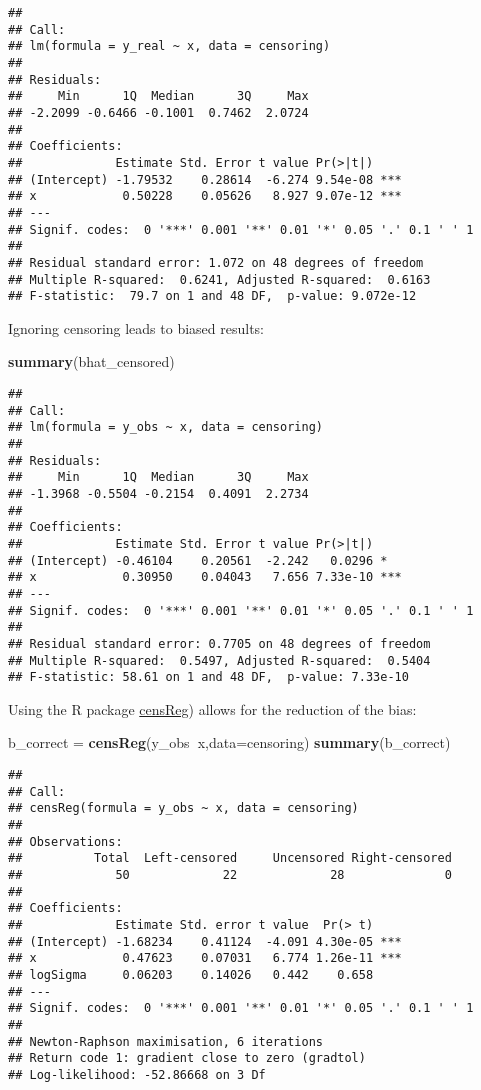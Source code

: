 \documentclass[
]{article}
\newenvironment{Shaded}{\begin{snugshade}}{\end{snugshade}}
\newcommand{\DataTypeTok}[1]{\textcolor[rgb]{0.13,0.29,0.53}{#1}}
\newcommand{\KeywordTok}[1]{\textcolor[rgb]{0.13,0.29,0.53}{\textbf{#1}}}
\newcommand{\NormalTok}[1]{#1}
\newcommand{\OperatorTok}[1]{\textcolor[rgb]{0.81,0.36,0.00}{\textbf{#1}}}
\newcommand{\StringTok}[1]{\textcolor[rgb]{0.31,0.60,0.02}{#1}}
\begin{document}
\begin{verbatim}
## 
## Call:
## lm(formula = y_real ~ x, data = censoring)
## 
## Residuals:
##     Min      1Q  Median      3Q     Max 
## -2.2099 -0.6466 -0.1001  0.7462  2.0724 
## 
## Coefficients:
##             Estimate Std. Error t value Pr(>|t|)    
## (Intercept) -1.79532    0.28614  -6.274 9.54e-08 ***
## x            0.50228    0.05626   8.927 9.07e-12 ***
## ---
## Signif. codes:  0 '***' 0.001 '**' 0.01 '*' 0.05 '.' 0.1 ' ' 1
## 
## Residual standard error: 1.072 on 48 degrees of freedom
## Multiple R-squared:  0.6241, Adjusted R-squared:  0.6163 
## F-statistic:  79.7 on 1 and 48 DF,  p-value: 9.072e-12
\end{verbatim}

Ignoring censoring leads to biased results:

\begin{Shaded}
\begin{Highlighting}[]
\KeywordTok{summary}\NormalTok{(bhat_censored)}
\end{Highlighting}
\end{Shaded}

\begin{verbatim}
## 
## Call:
## lm(formula = y_obs ~ x, data = censoring)
## 
## Residuals:
##     Min      1Q  Median      3Q     Max 
## -1.3968 -0.5504 -0.2154  0.4091  2.2734 
## 
## Coefficients:
##             Estimate Std. Error t value Pr(>|t|)    
## (Intercept) -0.46104    0.20561  -2.242   0.0296 *  
## x            0.30950    0.04043   7.656 7.33e-10 ***
## ---
## Signif. codes:  0 '***' 0.001 '**' 0.01 '*' 0.05 '.' 0.1 ' ' 1
## 
## Residual standard error: 0.7705 on 48 degrees of freedom
## Multiple R-squared:  0.5497, Adjusted R-squared:  0.5404 
## F-statistic: 58.61 on 1 and 48 DF,  p-value: 7.33e-10
\end{verbatim}

Using the R package \href{https://cran.r-project.org/web/packages/censReg/index.html}{censReg}) allows for the reduction of the bias:

\begin{Shaded}
\begin{Highlighting}[]
\NormalTok{b_correct =}\StringTok{ }\KeywordTok{censReg}\NormalTok{(y_obs}\OperatorTok{~}\NormalTok{x,}\DataTypeTok{data=}\NormalTok{censoring)}
\KeywordTok{summary}\NormalTok{(b_correct)}
\end{Highlighting}
\end{Shaded}

\begin{verbatim}
## 
## Call:
## censReg(formula = y_obs ~ x, data = censoring)
## 
## Observations:
##          Total  Left-censored     Uncensored Right-censored 
##             50             22             28              0 
## 
## Coefficients:
##             Estimate Std. error t value  Pr(> t)    
## (Intercept) -1.68234    0.41124  -4.091 4.30e-05 ***
## x            0.47623    0.07031   6.774 1.26e-11 ***
## logSigma     0.06203    0.14026   0.442    0.658    
## ---
## Signif. codes:  0 '***' 0.001 '**' 0.01 '*' 0.05 '.' 0.1 ' ' 1
## 
## Newton-Raphson maximisation, 6 iterations
## Return code 1: gradient close to zero (gradtol)
## Log-likelihood: -52.86668 on 3 Df
\end{verbatim}
\end{document}
